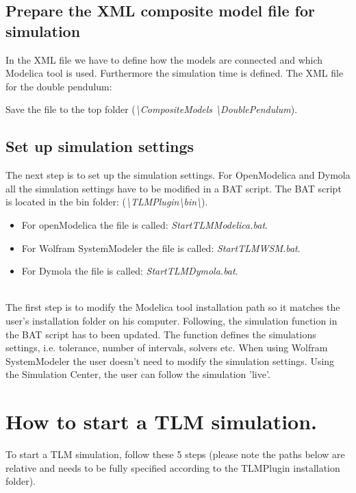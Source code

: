 \subsection{Prepare the XML composite model file for simulation }
In the XML file we have to define how the models are connected and which Modelica tool is used. 
Furthermore the simulation time is defined.
The XML file for the double pendulum: 
~\\

Save the file to the top folder (\textit{\textbackslash CompositeModels \textbackslash DoublePendulum}).

\subsection{Set up simulation settings}
The next step is to set up the simulation settings. 
For OpenModelica and Dymola all the simulation settings have to be modified in a BAT script. 
The BAT script is located in the bin folder: (\textit{\textbackslash TLMPlugin\textbackslash bin\textbackslash}).


\begin{itemize}
  \item For openModelica the file is called: \textit{StartTLMModelica.bat}.
  \item For Wolfram SystemModeler the file is called: \textit{StartTLMWSM.bat}.
  \item For Dymola the file is called: \textit{StartTLMDymola.bat}.
\end{itemize}

~\\The first step is to modify the Modelica tool installation path so it matches the user's installation folder on his computer. 
Following, the simulation function in the BAT script has to been updated. 
The function defines the simulations settings, i.e. tolerance, number of intervals, solvers etc. 
When using Wolfram SystemModeler the user doesn't need to modify the simulation settings. 
Using the Simulation Center, the user can follow the simulation 'live'.

\section{How to start a TLM simulation.}

To start a TLM simulation, follow these 5 steps (please note the paths below are relative and needs to be fully specified according to the TLMPlugin installation folder).

